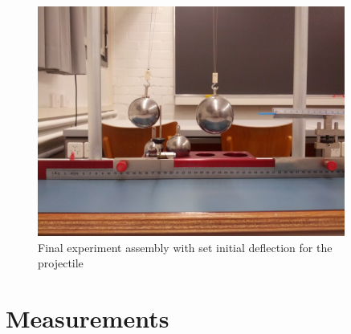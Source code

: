 \documentclass{scrreprt}
\begin{document}
\begin{figure}[H]
	\centering
  \includegraphics[width=0.9\textwidth]{img/assembly.jpg}
	\caption{Final experiment assembly with set initial deflection for the projectile}
	\label{fig:assembly}
\end{figure}

\section{Measurements}
\end{document}

